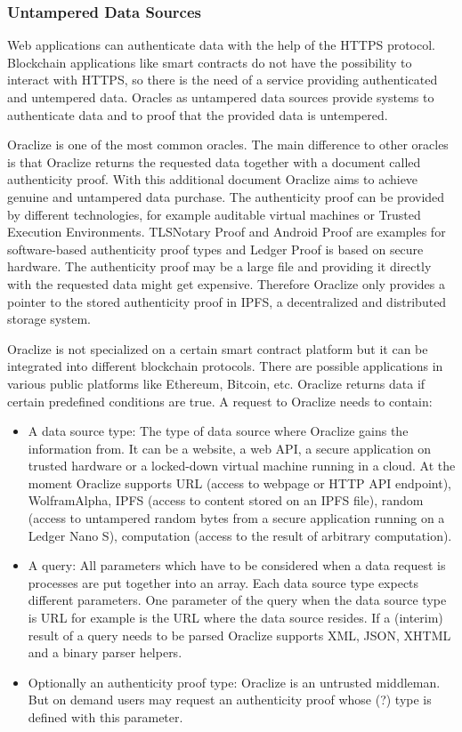 \documentclass[conference]{IEEEtran}
\begin{document}
\subsubsection{Untampered Data Sources}
Web applications can authenticate data with the help of the HTTPS protocol. Blockchain applications like smart contracts do not have the possibility to interact with HTTPS, so there is the need of a service providing authenticated and untempered data. Oracles as untampered data sources provide systems to authenticate data and to proof that the provided data is untempered. \cite{Oraclize2017} \par 
Oraclize is one of the most common oracles. \cite{Bartoletti2017} The main difference to other oracles is that Oraclize returns the requested data together with a document called authenticity proof. With this additional document Oraclize aims to achieve genuine and untampered data purchase. The authenticity proof can be provided by different technologies, for example auditable virtual machines or Trusted Execution Environments. TLSNotary Proof and Android Proof are examples for software-based authenticity proof types and Ledger Proof is based on secure hardware. The authenticity proof may be a large file and providing it directly with the requested data might get expensive. Therefore Oraclize only provides a pointer to the stored authenticity proof in IPFS, a decentralized and distributed storage system. \cite{Oraclize2017} \par
Oraclize is not specialized on a certain smart contract platform but it can be integrated into different blockchain protocols. There are possible applications in various public platforms like Ethereum, Bitcoin, etc. \cite{Oraclize2017}
Oraclize returns data if certain predefined conditions are true. A request to Oraclize needs to contain:
\begin{itemize}
	\item A data source type: The type of data source where Oraclize gains the information from. It can be a website, a web API, a secure application on trusted hardware or a locked-down virtual machine running in a cloud. At the moment Oraclize supports URL (access to  webpage or HTTP API endpoint), WolframAlpha, IPFS (access to content stored on an IPFS file), random (access to untampered random bytes from a secure application running on a Ledger Nano S), computation (access to the result of arbitrary computation).
	\item A query: All parameters which have to be considered when a data request is processes are put together into an array. Each data source type expects different parameters. One parameter of the query when the data source type is URL for example is the URL where the data source resides. If a (interim) result of a query needs to be parsed Oraclize supports XML, JSON, XHTML and a binary parser helpers.
	\item Optionally an authenticity proof type: Oraclize is an untrusted middleman. But on demand users may request an authenticity proof whose (?) type is defined with this parameter. \cite{Oraclize2017}
\end{itemize}
\end{document}
